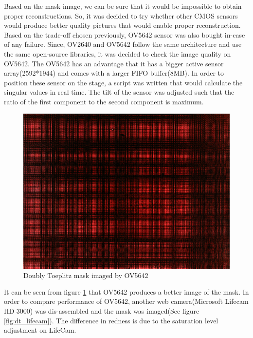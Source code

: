 Based on the mask image, we can be sure that it would be impossible to obtain proper reconstructions. So, it was decided to try whether other CMOS sensors would produce better quality pictures that would enable proper reconstruction. Based on the trade-off chosen previously, OV5642 sensor was also bought in-case of any failure. Since, OV2640 and OV5642 follow the same architecture and use the same open-source libraries, it was decided to check the image quality on OV5642. The OV5642 has an advantage that it has a bigger active sensor array(2592*1944) and comes with a larger FIFO buffer(8MB). In order to position these sensor on the stage, a script was written that would calculate the singular values in real time. The tilt of the sensor was adjusted such that the ratio of the first component to the second component is maximum. 
\begin{figure}[h]
\centering
\includegraphics[scale=0.125]{pics/slm/ov5642dtmask.jpg}
\caption{Doubly Toeplitz mask imaged by OV5642}
\label{fig:dt_ov5642}
\end{figure}
It can be seen from figure \ref{fig:dt_ov5642} that OV5642 produces a better image of the mask. In order to compare performance of OV5642, another web camera(Microsoft Lifecam HD 3000) was dis-assembled and the mask was imaged(See figure \ref{fig:dt_lifecam}). The difference in redness is due to the saturation level adjustment on LifeCam.
